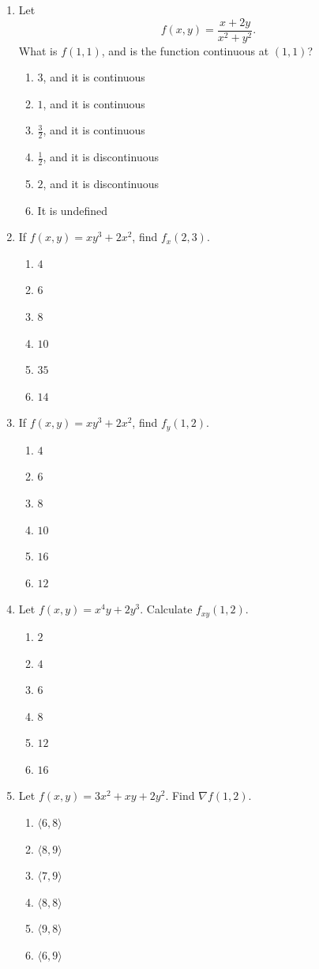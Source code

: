 \documentclass[a4paper,12pt]{article}
\theoremstyle{mystyle}
\numberwithin{equation}{section}
\numberwithin{theorem}{section}
\numberwithin{proposition}{section}
\numberwithin{example}{section}
\numberwithin{remark}{section}
\numberwithin{lemma}{section}
\numberwithin{corollary}{section}
\numberwithin{definition}{section}
\begin{document}
\begin{enumerate}[label=\textbf{Question \arabic*.}, leftmargin=*]
\item Let
\[
f(x,y)=\frac{x+2y}{x^{2}+y^{2}}.
\]
What is \(f(1,1)\), and is the function continuous at \((1,1)\)?
\begin{enumerate}[label=(\Alph*)]
\item \(3\), and it is continuous
\item \(1\), and it is continuous
\item \(\frac{3}{2}\), and it is continuous
\item \(\frac12\), and it is discontinuous
\item \(2\), and it is discontinuous
\item It is undefined
\end{enumerate}

\item If \(f(x,y)=xy^{3}+2x^{2}\), find \(f_x(2,3)\).
\begin{enumerate}[label=(\Alph*)]
\item \(4\)
\item \(6\)
\item \(8\)
\item \(10\)
\item \(35\)
\item \(14\)
\end{enumerate}

\item If \(f(x,y)=xy^{3}+2x^{2}\), find \(f_y(1,2)\).
\begin{enumerate}[label=(\Alph*)]
\item \(4\)
\item \(6\)
\item \(8\)
\item \(10\)
\item \(16\)
\item \(12\)
\end{enumerate}

\item Let \(f(x,y)=x^{4}y+2y^{3}\). Calculate \(f_{xy}(1,2)\).
\begin{enumerate}[label=(\Alph*)]
\item \(2\)
\item \(4\)
\item \(6\)
\item \(8\)
\item \(12\)
\item \(16\)
\end{enumerate}

\item Let \(f(x,y)=3x^{2}+xy+2y^{2}\). Find \(\nabla f(1,2)\).
\begin{enumerate}[label=(\Alph*)]
\item \(\langle 6,8\rangle\)
\item \(\langle 8,9\rangle\)
\item \(\langle 7,9\rangle\)
\item \(\langle 8,8\rangle\)
\item \(\langle 9,8\rangle\)
\item \(\langle 6,9\rangle\)
\end{enumerate}


\end{enumerate}
\end{document}
